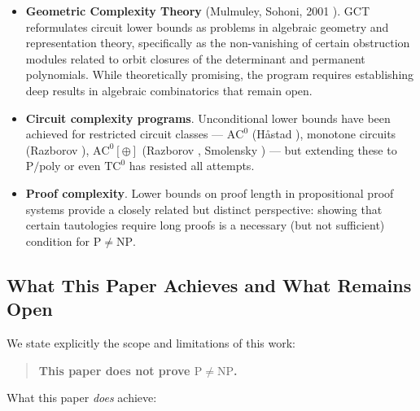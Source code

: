 \documentclass[11pt]{article}
\theoremstyle{definition}
\theoremstyle{remark}
\newcommand{\Ppoly}{\mathrm{P/poly}}
\newcommand{\ACz}{\mathrm{AC}^0}
\newcommand{\TCz}{\mathrm{TC}^0}
\begin{document}
\begin{itemize}[nosep]
  \item \textbf{Geometric Complexity Theory} (Mulmuley, Sohoni, 2001
    \cite{GCT}).  GCT reformulates circuit lower bounds as problems in
    algebraic geometry and representation theory, specifically as the
    non-vanishing of certain obstruction modules related to orbit closures
    of the determinant and permanent polynomials.  While theoretically
    promising, the program requires establishing deep results in algebraic
    combinatorics that remain open.

  \item \textbf{Circuit complexity programs}.  Unconditional lower bounds have
    been achieved for restricted circuit classes --- $\ACz$ (H\aa stad
    \cite{Hastad}), monotone circuits (Razborov \cite{Raz}), $\ACz[\oplus]$
    (Razborov \cite{Raz87}, Smolensky \cite{Smol87}) --- but extending these
    to $\Ppoly$ or even $\TCz$ has resisted all attempts.

  \item \textbf{Proof complexity}.  Lower bounds on proof length in
    propositional proof systems provide a closely related but distinct
    perspective: showing that certain tautologies require long proofs is a
    necessary (but not sufficient) condition for $\mathrm{P} \neq \mathrm{NP}$.
\end{itemize}

\subsection{What This Paper Achieves and What Remains Open}
\label{subsec:achievement}

We state explicitly the scope and limitations of this work:

\begin{quote}
\textbf{This paper does not prove $\mathrm{P} \neq \mathrm{NP}$.}
\end{quote}

\noindent
What this paper \emph{does} achieve:
\end{document}

